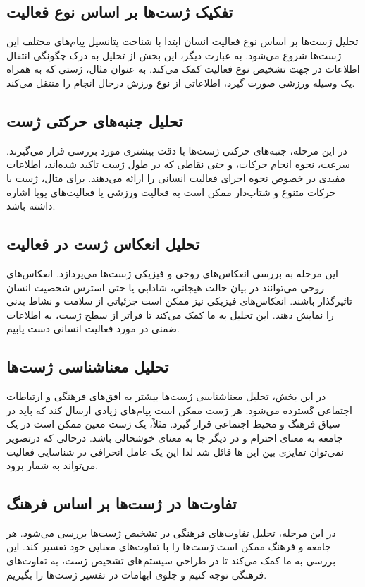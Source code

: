 \subsection{تفکیک ژست‌ها بر اساس نوع فعالیت}
تحلیل ژست‌ها بر اساس نوع فعالیت انسان ابتدا با شناخت پتانسیل پیام‌های مختلف این ژست‌ها شروع می‌شود. به عبارت دیگر، این بخش از تحلیل به درک چگونگی انتقال اطلاعات در جهت تشخیص نوع فعالیت کمک می‌کند. به عنوان مثال، ژستی که به همراه یک وسیله ورزشی صورت گیرد، اطلاعاتی از نوع ورزش درحال انجام را منتقل می‌کند.
\subsection{تحلیل جنبه‌های حرکتی ژست}
در این مرحله، جنبه‌های حرکتی ژست‌ها با دقت بیشتری مورد بررسی قرار می‌گیرند. سرعت، نحوه انجام حرکات، و حتی نقاطی که در طول ژست تاکید شده‌اند، اطلاعات مفیدی در خصوص نحوه اجرای فعالیت انسانی را ارائه می‌دهند. برای مثال، ژست با حرکات متنوع و شتاب‌دار ممکن است به فعالیت ورزشی یا فعالیت‌های پویا اشاره داشته باشد.

\subsection{تحلیل انعکاس ژست در فعالیت}

این مرحله به بررسی انعکاس‌های روحی و فیزیکی ژست‌ها می‌پردازد. انعکاس‌های روحی می‌توانند در بیان حالت هیجانی، شادابی یا حتی استرس شخصیت انسان تاثیرگذار باشند. انعکاس‌های فیزیکی نیز ممکن است جزئیاتی از سلامت و نشاط بدنی را نمایش دهند. این تحلیل به ما کمک می‌کند تا فراتر از سطح ژست، به اطلاعات ضمنی در مورد فعالیت انسانی دست یابیم.

\subsection{تحلیل معناشناسی ژست‌ها}

در این بخش، تحلیل معناشناسی ژست‌ها بیشتر به افق‌های فرهنگی و ارتباطات اجتماعی گسترده می‌شود. هر ژست ممکن است پیام‌های زیادی ارسال کند که باید در سیاق فرهنگ و محیط اجتماعی قرار گیرد. مثلاً، یک ژست معین ممکن است در یک جامعه به معنای احترام و در دیگر جا به معنای خوشحالی باشد. درحالی که درتصویر نمی‌توان تمایزی بین این ها قائل شد لذا این یک عامل انحرافی در شناسایی فعالیت می‌تواند به شمار برود.

\subsection{تفاوت‌ها در ژست‌ها بر اساس فرهنگ}

در این مرحله، تحلیل تفاوت‌های فرهنگی در تشخیص ژست‌ها بررسی می‌شود. هر جامعه و فرهنگ ممکن است ژست‌ها را با تفاوت‌های معنایی خود تفسیر کند. این بررسی به ما کمک می‌کند تا در طراحی سیستم‌های تشخیص ژست، به تفاوت‌های فرهنگی توجه کنیم و جلوی ابهامات در تفسیر ژست‌ها را بگیریم.

